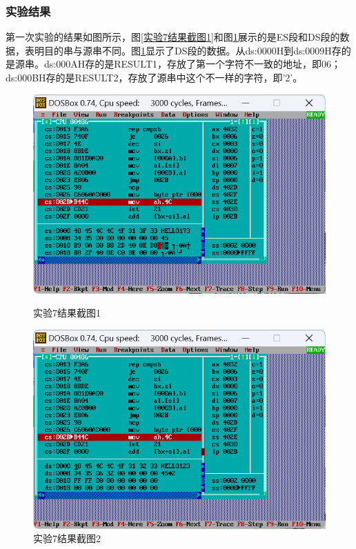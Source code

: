 \documentclass[12pt, a4paper, oneside]{ctexart}
\begin{document}
\subsubsection{实验结果}
第一次实验的结果如图所示，图\ref{实验7结果截图1}和图\ref{实验7结果截图2}展示的是ES段和DS段的数据，表明目的串与源串不同。图\ref{实验7结果截图2}显示了DS段的数据。从ds:0000H到ds:0009H存的是源串。ds:000AH存的是RESULT1，存放了第一个字符不一致的地址，即06；ds:000BH存的是RESULT2，存放了源串中这个不一样的字符，即'2'。
\begin{figure}[H]
    \centering
    \begin{minipage}{0.45\textwidth}
    \centering
    \includegraphics[scale=0.35]{pic/exp1_7_1es_segment.png}
    \caption{实验7结果截图1}
    \label{实验7结果截图1}
    \end{minipage}
    \hspace{0.05\textwidth}
    \begin{minipage}{0.45\textwidth}
    \centering
    \includegraphics[scale=0.35]{pic/exp1_7_1unequal.png}
    \caption{实验7结果截图2}
    \label{实验7结果截图2}
    \end{minipage}
\end{figure}
\end{document}
